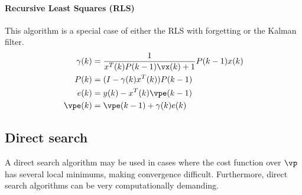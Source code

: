 \paragraph{Recursive Least Squares (RLS)}
This algorithm is a special case of either the RLS with forgetting
or the Kalman filter.
\begin{align*}
   \gamma(k) &= \frac{1}{x^T(k)P(k-1)\vx(k)+1}  P(k-1)x(k) \\
   P(k) &= (I-\gamma(k)x^T(k))P(k-1) \\
   e(k) &= y(k) - x^T(k)\vpe(k-1) \\
   \vpe(k) &= \vpe(k-1) + \gamma(k)e(k)
\end{align*}




\subsection{Direct search}
A direct search algorithm may be used in cases where the cost
function over $\vp$ has several local minimums, making convergence difficult.
Furthermore, direct search algorithms can be very computationally demanding.

